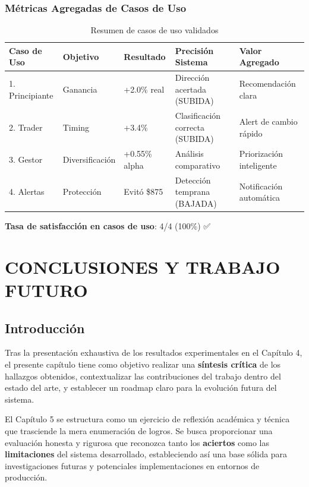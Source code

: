 \documentclass[12pt,a4paper]{report}
\begin{document}
\subsection{Métricas Agregadas de Casos de Uso}

\begin{table}[H]
\centering
\caption{Resumen de casos de uso validados}
\label{tab:casos-uso}
\small
\begin{tabular}{p{2.5cm}p{2.5cm}p{2cm}p{3cm}p{3cm}}
\toprule
\textbf{Caso de Uso} & \textbf{Objetivo} & \textbf{Resultado} & \textbf{Precisión Sistema} & \textbf{Valor Agregado} \\
\midrule
1. Principiante & Ganancia & +2.0\% real & Dirección acertada (SUBIDA) & Recomendación clara \\
2. Trader & Timing & +3.4\% & Clasificación correcta (SUBIDA) & Alert de cambio rápido \\
3. Gestor & Diversificación & +0.55\% alpha & Análisis comparativo & Priorización inteligente \\
4. Alertas & Protección & Evitó \$875 & Detección temprana (BAJADA) & Notificación automática \\
\bottomrule
\end{tabular}
\end{table}

\textbf{Tasa de satisfacción en casos de uso}: 4/4 (100\%) ✅


\chapter{CONCLUSIONES Y TRABAJO FUTURO}

\section*{Introducción}

Tras la presentación exhaustiva de los resultados experimentales en el Capítulo 4, el presente capítulo tiene como objetivo realizar una \textbf{síntesis crítica} de los hallazgos obtenidos, contextualizar las contribuciones del trabajo dentro del estado del arte, y establecer un roadmap claro para la evolución futura del sistema.

El Capítulo 5 se estructura como un ejercicio de reflexión académica y técnica que trasciende la mera enumeración de logros. Se busca proporcionar una evaluación honesta y rigurosa que reconozca tanto los \textbf{aciertos} como las \textbf{limitaciones} del sistema desarrollado, estableciendo así una base sólida para investigaciones futuras y potenciales implementaciones en entornos de producción.
\end{document}
